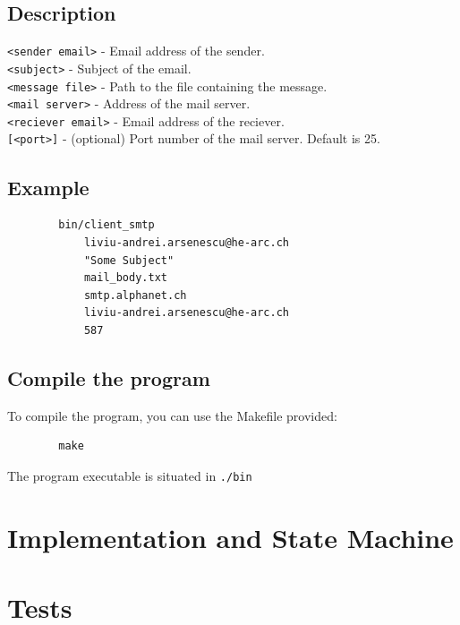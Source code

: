 \documentclass[12pt,a4paper]{article}
\begin{document}
    \subsection{Description}
    \verb|<sender email>| - Email address of the sender. \\
    \verb|<subject>| - Subject of the email. \\
    \verb|<message file>| - Path to the file containing the message. \\
    \verb|<mail server>| - Address of the mail server. \\
    \verb|<reciever email>| - Email address of the reciever. \\
    \verb|[<port>]| - (optional) Port number of the mail server. Default is 25.
    \subsection{Example}
    \begin{verbatim}
        bin/client_smtp
            liviu-andrei.arsenescu@he-arc.ch
            "Some Subject"
            mail_body.txt
            smtp.alphanet.ch
            liviu-andrei.arsenescu@he-arc.ch
            587
    \end{verbatim}
    \subsection{Compile the program}
    To compile the program, you can use the Makefile provided:
    \begin{verbatim}
        make
    \end{verbatim}
    The program executable is situated in \verb|./bin|
    \section{Implementation and State Machine}
    \section{Tests}
\end{document}
